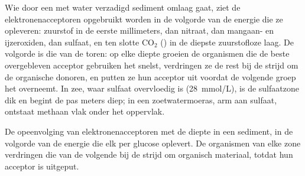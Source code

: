 \begin{proposition}\label{prop:b2:microbial-metabolism:sequence}
Wie door een met water verzadigd sediment omlaag gaat, ziet de
elektronenacceptoren opgebruikt worden in de volgorde van de energie
die ze opleveren: zuurstof in de eerste millimeters, dan nitraat, dan
mangaan- en ijzeroxiden, dan sulfaat, en ten slotte $\mathrm{CO_2}$
() in de diepste zuurstofloze laag. De volgorde is die van
de toren: op elke diepte groeien de organismen die de beste
overgebleven acceptor gebruiken het snelst, verdringen ze de rest bij de
strijd om de organische donoren, en putten ze hun acceptor uit voordat
de volgende groep het overneemt. In zee, waar sulfaat overvloedig is
(\qty{28}{mmol/L}), is de sulfaatzone dik en begint de 
pas meters diep; in een zoetwatermoeras, arm aan sulfaat, ontstaat
methaan vlak onder het oppervlak.
\end{proposition}

\begin{omfigure}

{\small De opeenvolging van elektronenacceptoren met de diepte in een
sediment, in de volgorde van de energie die elk per glucose oplevert.
De organismen van elke zone verdringen die van de volgende bij de
strijd om organisch materiaal, totdat hun acceptor is uitgeput.}
\end{omfigure}

